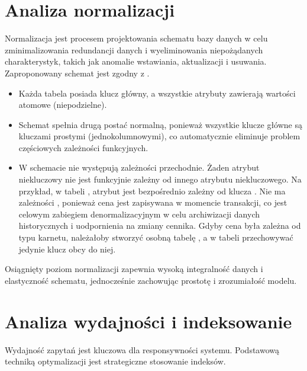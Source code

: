 \documentclass[letterpaper,10pt,polish]{sphinxmanual}
\begin{document}
\section{Analiza normalizacji}
\label{\detokenize{rozdzial4/rozdzial4:analiza-normalizacji}}
\sphinxAtStartPar
Normalizacja jest procesem projektowania schematu bazy danych w celu zminimalizowania redundancji danych i wyeliminowania niepożądanych charakterystyk, takich jak anomalie wstawiania, aktualizacji i usuwania. Zaproponowany schemat jest zgodny z .
\begin{itemize}
\item {} 
\sphinxAtStartPar
{} Każda tabela posiada klucz główny, a wszystkie atrybuty zawierają wartości atomowe (niepodzielne).

\item {} 
\sphinxAtStartPar
{} Schemat spełnia drugą postać normalną, ponieważ wszystkie klucze główne są kluczami prostymi (jednokolumnowymi), co automatycznie eliminuje problem częściowych zależności funkcyjnych.

\item {} 
\sphinxAtStartPar
{} W schemacie nie występują zależności przechodnie. Żaden atrybut niekluczowy nie jest funkcyjnie zależny od innego atrybutu niekluczowego. Na przykład, w tabeli , atrybut  jest bezpośrednio zależny od klucza . Nie ma zależności , ponieważ cena jest zapisywana w momencie transakcji, co jest celowym zabiegiem denormalizacyjnym w celu archiwizacji danych historycznych i uodpornienia na zmiany cennika. Gdyby cena była zależna od typu karnetu, należałoby stworzyć osobną tabelę , a w tabeli  przechowywać jedynie klucz obcy do niej.

\end{itemize}

\sphinxAtStartPar
{} Osiągnięty poziom normalizacji zapewnia wysoką integralność danych i elastyczność schematu, jednocześnie zachowując prostotę i zrozumiałość modelu.


\section{Analiza wydajności i indeksowanie}
\label{\detokenize{rozdzial4/rozdzial4:analiza-wydajnosci-i-indeksowanie}}
\sphinxAtStartPar
Wydajność zapytań jest kluczowa dla responsywności systemu. Podstawową techniką optymalizacji jest strategiczne stosowanie indeksów.
\end{document}

